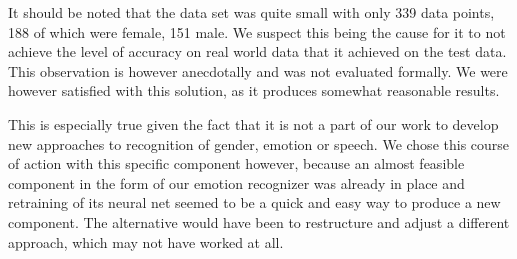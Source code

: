It should be noted that the data set was quite small with only 339 data points, 188 of which were female, 151 male. 
We suspect this being the cause for it to not achieve the level of accuracy on real world data that it achieved on the test data.
This observation is however anecdotally and was not evaluated formally.
We were however satisfied with this solution, as it produces somewhat reasonable results.

This is especially true given the fact that it is not a part of our work to develop new approaches to recognition of gender, emotion or speech.
We chose this course of action with this specific component however, because an almost feasible component in the form of our emotion recognizer was already in place and retraining of its neural net seemed to be a quick and easy way to produce a new component.
The alternative would have been to restructure and adjust a different approach, which may not have worked at all.







